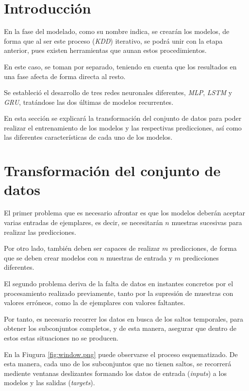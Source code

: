 
\section{Introducción}
En la fase del modelado, como su nombre indica, se crearán los modelos, de forma que al ser
este proceso (\textit{KDD}) iterativo, se podrá unir con la etapa anterior, pues existen
herramientas que aunan estos procedimientos.

En este caso, se toman por separado, teniendo en cuenta que los resultados en una
fase afecta de forma directa al resto.

Se estableció el desarrollo de tres redes neuronales diferentes, \textit{MLP}, 
\textit{LSTM} y \textit{GRU}, tratándose las dos últimas de modelos recurrentes.

En esta sección se explicará la transformación del conjunto de datos para poder
realizar el entrenamiento de los modelos y las respectivas predicciones, así como
las diferentes características de cada uno de los modelos.

\section{Transformación del conjunto de datos}
El primer problema que es necesario afrontar es que los modelos deberán aceptar varias
entradas de ejemplares, es decir, se necesitarán \(n\) muestras sucesivas para realizar las
predicciones.

Por otro lado, también deben ser capaces de realizar \(m\) predicciones, de forma que 
se deben crear modelos con \(n\) muestras de entrada y \(m\) predicciones diferentes.

El segundo problema deriva de la falta de datos en instantes concretos por el procesamiento
realizado previamente, tanto por la supresión de muestras con valores erróneos, como
la de ejemplares con valores faltantes.

Por tanto, es necesario recorrer los datos en busca de los saltos temporales, para obtener
los subconjuntos completos, y de esta manera, asegurar que dentro de estos estas situaciones
no se producen.


En la Fiugura \ref{fig:window.png} puede observarse el proceso esquematizado.
De esta manera, cada uno de los subconjuntos que no tienen saltos, se recorrerá 
mediente ventanas deslizantes formando los datos de entrada (\textit{inputs}) a los 
modelos y las salidas (\textit{targets}).

